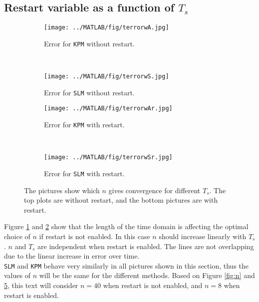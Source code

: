 \subsection{Restart variable as a function of $T_s$} %

\begin{figure}[H]
        \centering
        \begin{subfigure}[b]{0.3\textwidth}
                \texttt{[image: ../MATLAB/fig/terrorwA.jpg]}
                \caption{ Error for \texttt{KPM} without restart. }
                \label{fig:terrorwA}
        \end{subfigure}
		~
		\begin{subfigure}[b]{0.3\textwidth}
                \texttt{[image: ../MATLAB/fig/terrorwS.jpg]}
                \caption{ Error for \texttt{SLM} without restart. }
                \label{fig:terrorwS}
        \end{subfigure}
        
        \begin{subfigure}[b]{0.3\textwidth}
                \texttt{[image: ../MATLAB/fig/terrorwAr.jpg]}
                \caption{ Error for \texttt{KPM} with restart. }
                \label{fig:terrorwAr}
        \end{subfigure}
		~
		\begin{subfigure}[b]{0.3\textwidth}
                \texttt{[image: ../MATLAB/fig/terrorwSr.jpg]}
                \caption{ Error for \texttt{SLM} with restart. }
                \label{fig:terrorwSr}
        \end{subfigure}        
        
        \caption{ The pictures show which $n$ gives convergence for different $T_s$. The top plots are without restart, and the bottom pictures are with restart.}
        \label{fig:rest}
\end{figure}
Figure \ref{fig:terrorwA} and \ref{fig:terrorwS} show that the length of the time domain is affecting the optimal choice of $n$ if restart is not enabled. In this case $n$ should increase linearly with $T_s$. $n$ and $T_s$ are independent when restart is enabled. The lines are not overlapping due to the linear increase in error over time.\\

\noindent \texttt{SLM} and \texttt{KPM} behave very similarly in all pictures shown in this section, thus the values of $n$ will be the same for the different methods. Based on Figure \ref{fig:n} and \ref{fig:rest}, this text will consider $n = 40$ when restart is not enabled, and $n = 8$ when restart is enabled. 

